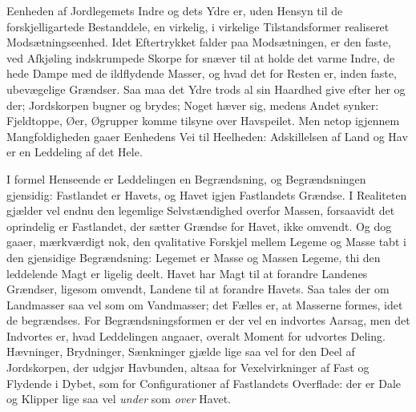 \documentclass[12pt,a4paper]{book}
\begin{document}
Eenheden af Jordlegemets Indre og dets Ydre er, uden Hensyn til de
forskjelligartede Bestanddele, en virkelig, i virkelige Tilstandsformer
realiseret Modsætningseenhed. Idet Eftertrykket falder paa Modsætningen,
er den faste, ved Afkjøling indskrumpede Skorpe for snæver til at holde
det varme Indre, de hede Dampe med de ildflydende Masser, og hvad det for
Resten er, inden faste, ubevægelige Grændser. Saa maa det Ydre trods al
sin Haardhed give efter her og der; Jordskorpen bugner og brydes; Noget
hæver sig, medens Andet synker: Fjeldtoppe, Øer, Øgrupper komme tilsyne
over Havspeilet. Men netop igjennem Mangfoldigheden
gaaer Eenhedens Vei til Heelheden: Adskillelsen af Land og Hav er en
Leddeling af det Hele.

I formel Henseende er Leddelingen en Begrændsning, og Begrændsningen
gjensidig: Fastlandet er Havets, og Havet igjen Fastlandets Grændse. I
Realiteten gjælder vel endnu den legemlige Selvstændighed overfor Massen,
forsaavidt det oprindelig er Fastlandet, der sætter Grændse for Havet,
ikke omvendt. Og dog gaaer, mærkværdigt nok, den qvalitative Forskjel
mellem Legeme og Masse tabt i den gjensidige Begrændsning: Legemet er
Masse og Massen Legeme, thi den leddelende Magt er ligelig deelt. Havet
har Magt til at forandre Landenes Grændser, ligesom omvendt, Landene til
at forandre Havets. Saa tales der om Landmasser saa vel som om
Vandmasser; det Fælles er, at Masserne formes, idet de begrændses. For
Begrændsningsformen er der vel en indvortes Aarsag, men det Indvortes er,
hvad Leddelingen angaaer, overalt Moment for udvortes Deling. Hævninger,
Brydninger, Sænkninger gjælde lige saa vel for den Deel af Jordskorpen,
der udgjør Havbunden, altsaa for Vexelvirkninger af Fast og Flydende i
Dybet, som for Configurationer af Fastlandets Overflade: der er Dale og
Klipper lige saa vel \emph{under} som \emph{over} Havet.
\end{document}
